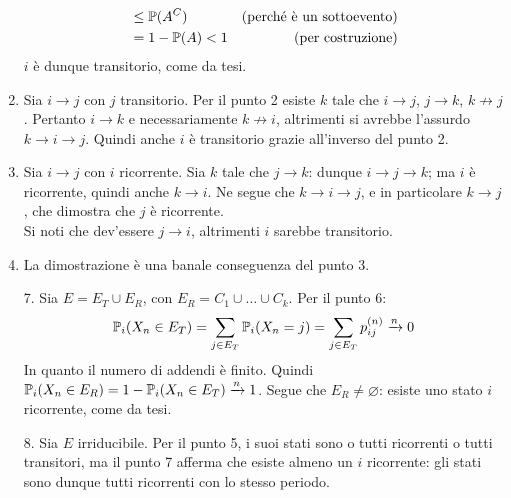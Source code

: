 \begin{dimo}
\begin{enumerate}
\begin{align*}
			&\le \mathbb P(A^C) &\text{(perché è un sottoevento)} \\
			&= 1-\mathbb P(A) < 1 &\text{(per costruzione)}
		\end{align*}
		$i$ è dunque transitorio, come da tesi.
		\item Sia $i \to j$ con $j$ transitorio. Per il punto 2 esiste $k$ tale che $i \to j$, $j \to k$, $k \not\to j$.
		Pertanto $i \to k$ e necessariamente $k \not\to i$, altrimenti si avrebbe l'assurdo $k \to i \to j$.
		Quindi anche $i$ è transitorio grazie all'inverso del punto 2.
		\item Sia $i \to j$ con $i$ ricorrente.
		Sia $k$ tale che $j \to k$: dunque $i \to j \to k$; ma $i$ è ricorrente, quindi anche $k \to i$.
		Ne segue che $k \to i \to j$, e in particolare $k \to j$, che dimostra che $j$ è ricorrente. \\
		Si noti che dev'essere $j \to i$, altrimenti $i$ sarebbe transitorio.
		\item La dimostrazione è una banale conseguenza del punto 3.
		\item[7.] Sia $E = E_T \cup E_R$, con $E_R = C_1 \cup \dots \cup C_k$.
		Per il punto 6:
		$$\mathbb P_i(X_n \in E_T) = \sum_{j \in E_T} \mathbb P_i(X_n = j) = \sum_{j \in E_T} p_{ij}^{(n)} \xrightarrow{n} 0$$
		In quanto il numero di addendi è finito.
		Quindi $\mathbb P_i(X_n \in E_R) = 1-\mathbb P_i(X_n \in E_T) \xrightarrow{n} 1$.
		Segue che $E_R \neq \varnothing$: esiste uno stato $i$ ricorrente, come da tesi.
		\item[8.] Sia $E$ irriducibile.
		Per il punto 5, i suoi stati sono o tutti ricorrenti o tutti transitori, ma il punto 7 afferma
		che esiste almeno un $i$ ricorrente: gli stati sono dunque tutti ricorrenti con lo stesso periodo. \qedhere
	\end{enumerate}
\end{dimo}

